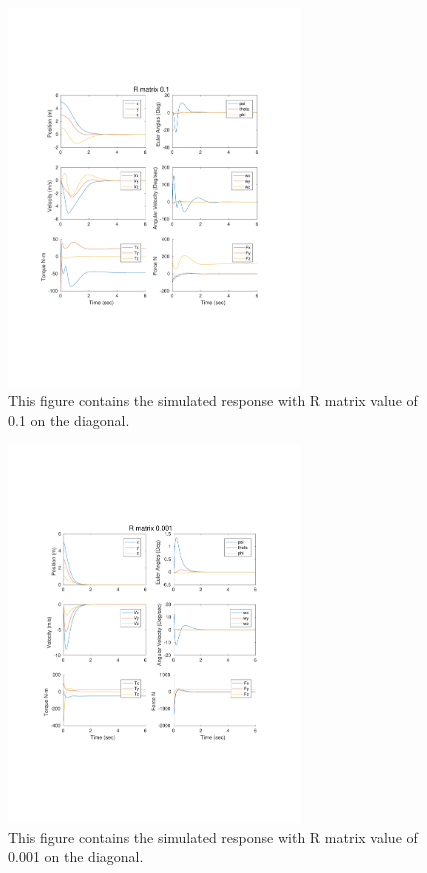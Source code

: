 \documentclass{article}
\begin{document}
\begin{figure}[H]
    \centering
        \includegraphics[clip, trim=2cm 6cm 3cm 5cm, width=0.69\textwidth]{R_0_1_plot.pdf}
    \caption{This figure contains the simulated response with R matrix value of 0.1 on the diagonal.}
    \label{fig:R_0.1}
\end{figure}

\begin{figure}[H]
\centering
  \includegraphics[clip, trim=2cm 6cm 3cm 5cm, width=0.69\textwidth]{R_0_001_plot}
  \caption{This figure contains the simulated response with R matrix value of 0.001 on the diagonal.}
  \label{fig:R_0.001}
\end{figure}
\end{document}
